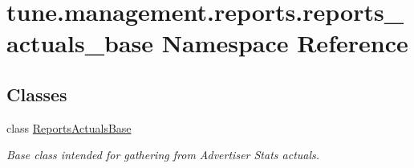 \hypertarget{namespacetune_1_1management_1_1reports_1_1reports__actuals__base}{\section{tune.\-management.\-reports.\-reports\-\_\-actuals\-\_\-base Namespace Reference}
\label{namespacetune_1_1management_1_1reports_1_1reports__actuals__base}
}
\subsection*{Classes}
\begin{DoxyCompactItemize}
\item 
class \hyperlink{classtune_1_1management_1_1reports_1_1reports__actuals__base_1_1ReportsActualsBase}{Reports\-Actuals\-Base}
\begin{DoxyCompactList}\small\item\em Base class intended for gathering from Advertiser Stats actuals. \end{DoxyCompactList}\end{DoxyCompactItemize}
